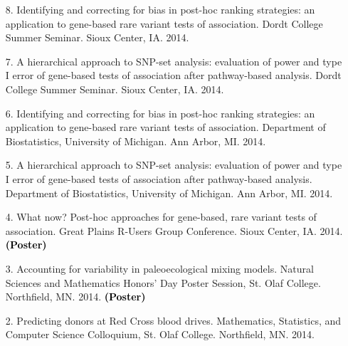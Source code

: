 \documentclass[margin]{res}
\newcommand{\annotate}[1]{\textcolor{black}{\textbf{(#1)}}}
\begin{document}
\begin{resume}
\begin{itemize}

\item[8.] %
Identifying and correcting for bias in post-hoc ranking strategies: an application to gene-based rare variant tests of association. 
Dordt College Summer Seminar. Sioux Center, IA. 2014.

\item[7.] %
A hierarchical approach to SNP-set analysis: evaluation of power and type I error of gene-based tests of association after pathway-based analysis. 
Dordt College Summer Seminar. Sioux Center, IA. 2014.

\item[6.] %
Identifying and correcting for bias in post-hoc ranking strategies: an application to gene-based rare variant tests of association. 
Department of Biostatistics, University of Michigan. Ann Arbor, MI. 2014.

\item[5.] %
A hierarchical approach to SNP-set analysis: evaluation of power and type I error of gene-based tests of association after pathway-based analysis. 
Department of Biostatistics, University of Michigan. Ann Arbor, MI. 2014.

\item[4.] %
What now? Post-hoc approaches for gene-based, rare variant tests of association. 
Great Plains R-Users Group Conference. Sioux Center, IA. 2014. 
\annotate{Poster}

\item[3.] %
Accounting for variability in paleoecological mixing models. 
Natural Sciences and Mathematics Honors’ Day Poster Session, St. Olaf College. Northfield, MN. 2014. 
\annotate{Poster}


\item[2.] %
Predicting donors at Red Cross blood drives. 
Mathematics, Statistics, and Computer Science Colloquium, St. Olaf College. Northfield, MN. 2014.


\end{itemize}
\end{resume}
\end{document}
